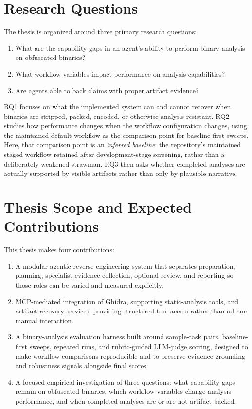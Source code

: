 \section{Research Questions}

The thesis is organized around three primary research questions:
\begin{enumerate}
\item What are the capability gaps in an agent's ability to perform binary analysis on obfuscated binaries?
\item What workflow variables impact performance on analysis capabilities?
\item Are agents able to back claims with proper artifact evidence?
\end{enumerate}

RQ1 focuses on what the implemented system can and cannot recover when binaries are stripped, packed, encoded, or otherwise analysis-resistant. RQ2 studies how performance changes when the workflow configuration changes, using the maintained default workflow as the comparison point for baseline-first sweeps. Here, that comparison point is an \emph{inferred baseline}: the repository's maintained staged workflow retained after development-stage screening, rather than a deliberately weakened strawman. RQ3 then asks whether completed analyses are actually supported by visible artifacts rather than only by plausible narrative.

\section{Thesis Scope and Expected Contributions}

This thesis makes four contributions:
\begin{enumerate}
\item A modular agentic reverse-engineering system that separates preparation, planning, specialist evidence collection, optional review, and reporting so those roles can be varied and measured explicitly.
\item MCP-mediated integration of Ghidra, supporting static-analysis tools, and artifact-recovery services, providing structured tool access rather than ad hoc manual interaction.
\item A binary-analysis evaluation harness built around sample-task pairs, baseline-first sweeps, repeated runs, and rubric-guided LLM-judge scoring, designed to make workflow comparisons reproducible and to preserve evidence-grounding and robustness signals alongside final scores.
\item A focused empirical investigation of three questions: what capability gaps remain on obfuscated binaries, which workflow variables change analysis performance, and when completed analyses are or are not artifact-backed.
\end{enumerate}

